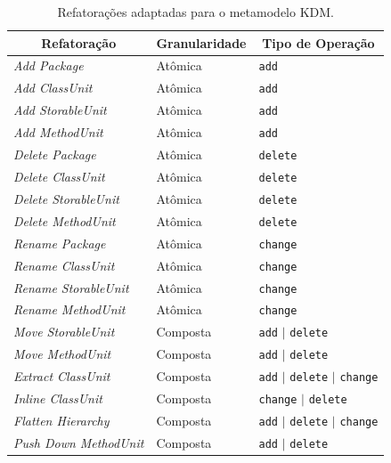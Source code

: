 
\begin{table}[h]
\caption{Refatorações adaptadas para o metamodelo KDM.\label{tab:refatoringsCatalogo}}
\begin{center}
\begin{tabular}{ | m{4.5cm} | m{2.5cm} | m{4cm}| } 
\hline
\multicolumn{1}{|c|}{Refatoração} & \multicolumn{1}{|c|}{Granularidade} & \multicolumn{1}{|c|}{Tipo de Operação}\\ 
\hline
\textit{Add Package} &  Atômica & \texttt{add}\\ 
\hline
\textit{Add ClassUnit} &  Atômica & \texttt{add}\\ 
\hline
\textit{Add StorableUnit} &  Atômica & \texttt{add}\\ 
\hline
\textit{Add MethodUnit} &  Atômica & \texttt{add}\\ 
\hline
\textit{Delete Package} &  Atômica & \texttt{delete}\\ 
\hline
\textit{Delete ClassUnit} &  Atômica & \texttt{delete}\\ 
\hline
\textit{Delete StorableUnit} &  Atômica & \texttt{delete}\\ 
\hline
\textit{Delete MethodUnit} &  Atômica & \texttt{delete}\\ 
\hline
\textit{Rename Package} &  Atômica & \texttt{change}\\ 
\hline
\textit{Rename ClassUnit} &  Atômica & \texttt{change}\\ 
\hline
\textit{Rename StorableUnit} &  Atômica & \texttt{change}\\ 
\hline
\textit{Rename MethodUnit} &  Atômica & \texttt{change}\\ 
\hline
\textit{Move StorableUnit} &  Composta & \texttt{add} $|$ \texttt{delete}\\ 
\hline
\textit{Move MethodUnit} &  Composta & \texttt{add} $|$ \texttt{delete}\\ 
\hline
\textit{Extract ClassUnit} &  Composta & \texttt{add} $|$ \texttt{delete} $|$ \texttt{change}\\
\hline
\textit{Inline ClassUnit} &  Composta & \texttt{change} $|$ \texttt{delete}\\ 
\hline
\textit{Flatten Hierarchy} &  Composta & \texttt{add} $|$ \texttt{delete} $|$ \texttt{change}\\ 
\hline
\textit{Push Down MethodUnit} &  Composta & \texttt{add} $|$ \texttt{delete}\\ 

\end{tabular}
\end{center}
\end{table}
